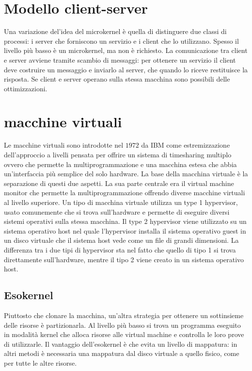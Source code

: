 \section{Modello client-server}
Una variazione del'idea del microkernel \`e quella di distinguere due classi di processi: i server che forniscono un servizio e i client che lo utilizzano. Spesso il livello pi\`u basso
\`e un microkernel, ma non \`e richiesto. La comunicazione tra client e server avviene tramite scambio di messaggi: per ottenere un servizio il client deve costruire un messaggio e 
inviarlo al server, che quando lo riceve restituisce la risposta. Se client e server operano sulla stessa macchina sono possibili delle ottimizzazioni.  
\section{macchine virtuali}
Le macchine virtuali sono introdotte nel $1972$ da IBM come estremizzazione dell'approccio a livelli pensata per offrire un sistema di timesharing multiplo ovvero che permette la
multiprogrammazione e una macchina estesa che abbia un'interfaccia pi\`u semplice del solo hardware. La base della macchina virtuale \`e la separazione di questi due aspetti. La sua parte
centrale era il virtual machine monitor che permette la multiprogrammazione offrendo diverse macchine virtuali al livello superiore. Un tipo di macchina virtuale utilizza un type 1 
hypervisor, usato comunemente che si trova sull'hardware e permette di eseguire diversi sistemi operativi sulla stessa macchina. Il type 2 hypervisor viene utilizzato su un sistema 
operativo host nel quale l'hypervisor installa il sistema operativo guest in un disco virtuale che il sistema host vede come un file di grandi dimensioni. La differenza tra i due tipi
di hypervisor sta nel fatto che quello di tipo 1 si trova direttamente sull'hardware, mentre il tipo 2 viene creato in un sistema operativo host.
\subsection{Esokernel}
Piuttosto che clonare la macchina, un'altra strategia per ottenere un sottinsieme delle risorse \`e partizionarla. Al livello pi\`u basso si trova un programma eseguito in modalit\`a
kernel che alloca risorse alle virtual machine e controlla le loro prove di utilizzarle. Il vantaggio dell'esokernel \`e che evita un livello di mappatura: in altri metodi \`e necessaria
una mappatura dal disco virtuale a quello fisico, come per tutte le altre risorse. 

